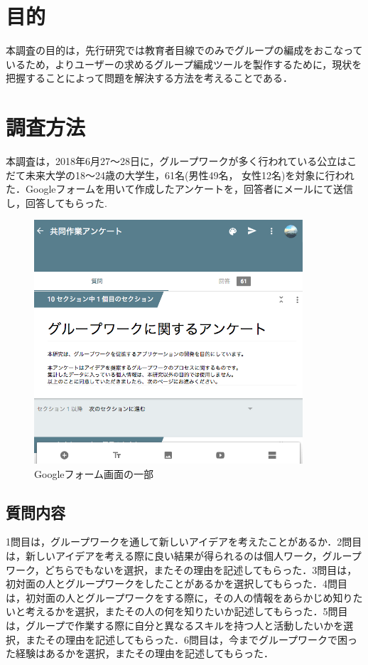 \documentclass{funthesis}
\begin{document}
\section{目的}

本調査の目的は，先行研究では教育者目線でのみでグループの編成をおこなっているため，よりユーザーの求めるグループ編成ツールを製作するために，現状を把握することによって問題を解決する方法を考えることである．

\section{調査方法}

本調査は，2018年6月27〜28日に，グループワークが多く行われている公立はこだて未来大学の18〜24歳の大学生，61名(男性49名， 女性12名)を対象に行われた．Googleフォームを用いて作成したアンケートを，回答者にメールにて送信し，回答してもらった.
\begin{figure}[H]
 \centering
   \includegraphics[width=100mm]{figures/groupwork1.png}
 \caption{Googleフォーム画面の一部}
 \label{fig:model}
\end{figure}


\subsection{質問内容}

1問目は，グループワークを通して新しいアイデアを考えたことがあるか．2問目は，新しいアイデアを考える際に良い結果が得られるのは個人ワーク，グループワーク，どちらでもないを選択，またその理由を記述してもらった．3問目は，初対面の人とグループワークをしたことがあるかを選択してもらった．4問目は，初対面の人とグループワークをする際に，その人の情報をあらかじめ知りたいと考えるかを選択，またその人の何を知りたいか記述してもらった．5問目は，グループで作業する際に自分と異なるスキルを持つ人と活動したいかを選択，またその理由を記述してもらった．6問目は，今までグループワークで困った経験はあるかを選択，またその理由を記述してもらった．
\end{document}
